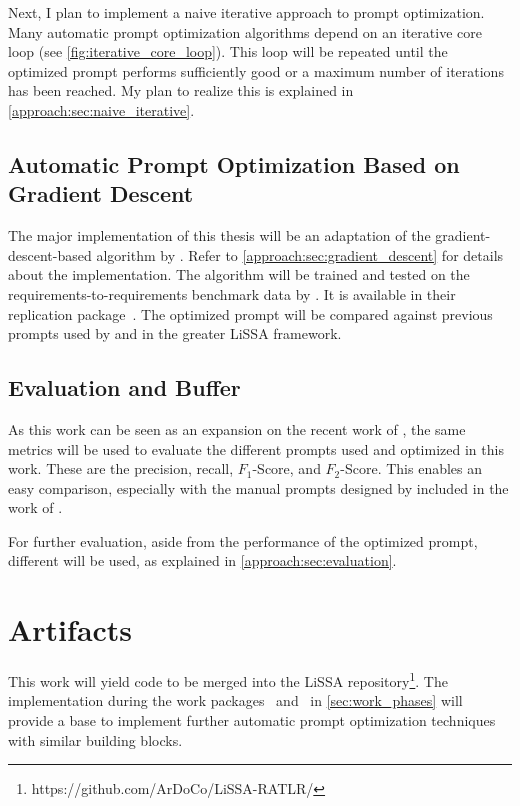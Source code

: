 Next, I plan to implement a naive iterative approach to prompt optimization.
Many automatic prompt optimization algorithms \citeiterative depend on an iterative core loop (see \autoref{fig:iterative_core_loop}). This loop will be repeated until the optimized prompt performs sufficiently good or a maximum number of iterations has been reached.
My plan to realize this is explained in \autoref{approach:sec:naive_iterative}.

\subsection{Automatic Prompt Optimization Based on Gradient Descent}
\label{phase_gradient_descent}
The major implementation of this thesis will be an adaptation of the gradient-descent-based \APO algorithm by .
Refer to \autoref{approach:sec:gradient_descent} for details about the implementation.
The \APO algorithm will be trained and tested on the requirements-to-requirements benchmark data by \citeauthor{hey2025RequirementsTraceability}.
It is available in their replication package~\cite{hey2025ReplicationPackage}.
The optimized prompt will be compared against previous prompts used by \citeauthor{fuchss2025LiSSAGeneric} and \citeauthor{hey2025RequirementsTraceability} in the greater LiSSA framework.


\subsection{Evaluation and Buffer}
\label{phase_evaluation}
As this work can be seen as an expansion on the recent work of , the same metrics will be used to evaluate the different prompts used and optimized in this work.
These are the precision, recall, $F_1$-Score, and $F_2$-Score.
This enables an easy comparison, especially with the manual prompts designed by  included in the work of \citeauthor{hey2025RequirementsTraceability}.

For further evaluation, aside from the performance of the optimized prompt, different \LLMs will be used, as explained in \autoref{approach:sec:evaluation}.




\section{Artifacts}
\label{sec:work_artifacts}
This work will yield code to be merged into the LiSSA repository\footnote{https://github.com/ArDoCo/LiSSA-RATLR/}.
The implementation during the work packages~ and~ in \autoref{sec:work_phases} will provide a base to implement further automatic prompt optimization techniques with similar building blocks.

